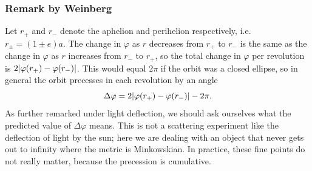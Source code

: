 		\subsubsection{Remark by Weinberg}
		Let $r_+$ and $r_-$ denote the aphelion and perihelion respectively, i.e. $r_{\pm} = (1 \pm e)a$. The change in $\varphi$ as $r$ decreases from $r_+$ to $r_-$ is the same as the change in $\varphi$ as $r$ increases from $r_-$ to $r_+$, so the total change in $\varphi$ per revolution is $2 \abs{\varphi(r_+)-\varphi(r_-)}$. This would equal $2\pi$ if the orbit was a closed ellipse, so in general the orbit precesses in each revolution by an angle
		\begin{equation}
		\Delta \varphi = 2 \abs{\varphi(r_+)-\varphi(r_-)} - 2\pi.
		\end{equation}
		As further remarked under light deflection, we should ask ourselves what the predicted value of $\Delta \varphi$ means. This is not a scattering experiment like the deflection of light by the sun; here we are dealing with an object that never gets out to infinity where the metric is Minkowskian. In practice, these fine points do not really matter, because the precession is cumulative.
		
		
		
		
		
		
		
